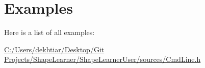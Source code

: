 \section{Examples}
Here is a list of all examples\+:\begin{DoxyCompactItemize}
\item 
\hyperlink{_c_1_2_users_2dekhtiar_2_desktop_2_git_01_projects_2_shape_learner_2_shape_learner_user_2sources_2_cmd_line_8h-example}{C\+:/\+Users/dekhtiar/\+Desktop/\+Git Projects/\+Shape\+Learner/\+Shape\+Learner\+User/sources/\+Cmd\+Line.\+h}
\end{DoxyCompactItemize}
